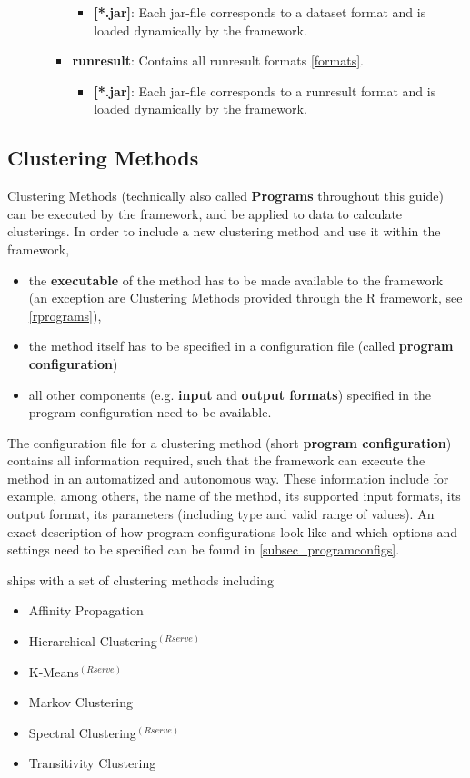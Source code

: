 \begin{itemize}[noitemsep]
\begin{itemize}
\begin{itemize}[noitemsep,nolistsep]
\begin{itemize}[noitemsep,nolistsep]
							\item \textbf{[*.jar]}: Each jar-file corresponds to a dataset format and is loaded dynamically by the framework.
						\end{itemize}
						\item \textbf{runresult}: Contains all runresult formats \ref{formats}.
						\begin{itemize}[noitemsep,nolistsep]
							\item \textbf{[*.jar]}: Each jar-file corresponds to a runresult format and is loaded dynamically by the framework.
						\end{itemize}
					\end{itemize}
				\end{itemize}
			\end{itemize}
	 
	 \subsection{Clustering Methods}\label{programs}
	 Clustering Methods (technically also called \textbf{Programs} throughout this guide) can be executed by the framework, and be applied to data to calculate clusterings.
	 In order to include a new clustering method and use it within the framework, 
	\begin{itemize}		
		\item the \textbf{executable} of the method has to be made available to the framework (an exception are Clustering Methods provided through the R framework, see \ref{rprograms}), 
		\item the method itself has to be specified in a configuration file (called \textbf{program configuration})
		\item all other components (e.g. \textbf{input} and \textbf{output formats}) specified in the program configuration need to be available.
\end{itemize}
The configuration file for a clustering method (short \textbf{program configuration}) contains all information required, such that the framework can execute the method in an automatized and autonomous way. These information include for example, among others, the name of the method, its supported input formats, its output format, its parameters (including type and valid range of values). An exact description of how program configurations look like and which options and settings need to be specified can be found in \ref{subsec_programconfigs}.
	
	\clusteval ships with a set of clustering methods including
	\begin{itemize}
		\item Affinity Propagation
		\item Hierarchical Clustering$^{(Rserve)}$
		\item K-Means$^{(Rserve)}$
		\item Markov Clustering
		\item Spectral Clustering$^{(Rserve)}$
		\item Transitivity Clustering
	\end{itemize}
	
